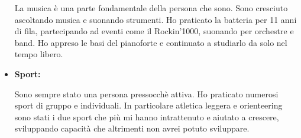 \documentclass{paper}
\begin{document}
\begin{itemize}
    La musica è una parte fondamentale della persona che sono.
    Sono cresciuto ascoltando musica e suonando strumenti.
    Ho praticato la batteria per 11 anni di fila, partecipando
    ad eventi come il Rockin'1000, suonando per orchestre e
    band. Ho appreso le basi del pianoforte e continuato a
    studiarlo da solo nel tempo libero.

    \item \textbf{Sport:}
    
    Sono sempre stato una persona pressocchè attiva.
    Ho praticato numerosi sport di gruppo e individuali.
    In particolare atletica leggera e orienteering sono
    stati i due sport che più mi hanno intrattenuto e aiutato
    a crescere, sviluppando capacità che altrimenti non avrei
    potuto sviluppare.
\end{itemize}
\end{document}
